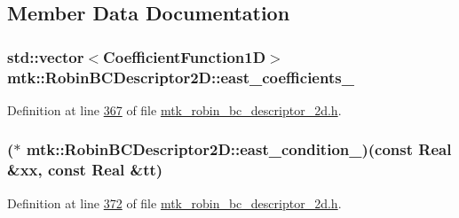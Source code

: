 \subsection{Member Data Documentation}
\hypertarget{classmtk_1_1RobinBCDescriptor2D_aacf640e8d310f53fc9b0a10b66e04ab6}{
\subsubsection[{east\+\_\+coefficients\+\_\+}]{\setlength{\rightskip}{0pt plus 5cm}std\+::vector$<${\bf Coefficient\+Function1\+D}$>$ mtk\+::\+Robin\+B\+C\+Descriptor2\+D\+::east\+\_\+coefficients\+\_\+\hspace{0.3cm}{\ttfamily [private]}}}\label{classmtk_1_1RobinBCDescriptor2D_aacf640e8d310f53fc9b0a10b66e04ab6}


Definition at line \hyperlink{mtk__robin__bc__descriptor__2d_8h_source_l00367}{367} of file \hyperlink{mtk__robin__bc__descriptor__2d_8h_source}{mtk\+\_\+robin\+\_\+bc\+\_\+descriptor\+\_\+2d.\+h}.

\hypertarget{classmtk_1_1RobinBCDescriptor2D_a9b2b901adfa258a8e05788857de31c8a}{
\subsubsection[{east\+\_\+condition\+\_\+}]{($\ast$ mtk\+::\+Robin\+B\+C\+Descriptor2\+D\+::east\+\_\+condition\+\_\+)(const {\bf Real} \&xx, const {\bf Real} \&tt)\hspace{0.3cm}{\ttfamily [private]}}}\label{classmtk_1_1RobinBCDescriptor2D_a9b2b901adfa258a8e05788857de31c8a}


Definition at line \hyperlink{mtk__robin__bc__descriptor__2d_8h_source_l00372}{372} of file \hyperlink{mtk__robin__bc__descriptor__2d_8h_source}{mtk\+\_\+robin\+\_\+bc\+\_\+descriptor\+\_\+2d.\+h}.

